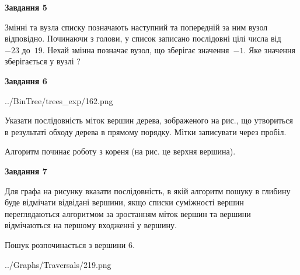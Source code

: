 \documentclass[12pt, ukrainian]{article}
\begin{document}
{\begin {large}
{\begin {center}\textbf{Завдання 5}\end {center}}\par
Змінні  та  вузла списку позначають наступний та попередній за ним вузол відповідно. Починаючи з голови, у список записано послідовні цілі числа від~$-23$ до~$19$. Нехай змінна  позначає вузол, що зберігає значення~$-1$.
Яке значення зберігається у вузлі  ?\par
\newpage

{\begin {center}\textbf{Завдання 6}\end {center}}\par

\begin{center}
	{../BinTree/trees_exp/162.png}
\end{center}
Указати послідовність міток вершин дерева, зображеного на рис., що утвориться в результаті обходу дерева в прямому порядку. Мітки записувати через пробіл.\par Алгоритм починає роботу з кореня (на рис. це верхня вершина).\par
\newpage

{\begin {center}\textbf{Завдання 7}\end {center}}\par
Для графа на рисунку вказати послідовність, в якій алгоритм пошуку в глибину буде відмічати відвідані вершини, якщо списки суміжності вершин переглядаються алгоритмом за зростанням міток вершин та вершини відмічаються на першому вход\-женні у вершину.\par
Пошук розпочинається з вершини 6.\par

\begin{center}
	{../Graphs/Traversals/219.png}
\end{center}\par
\newpage


\end{large}}
\end{document}
